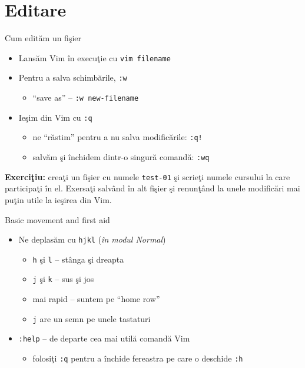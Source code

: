 \documentclass{beamer}
\begin{document}
\section{Editare}
\frame{\tableofcontents[currentsection]}

\begin{frame}{Cum edităm un fişier}
\begin{itemize}
  \item<1-> Lansăm Vim în execuţie cu \texttt{vim filename}
  \item<2-> Pentru a salva schimbările, \texttt{:w}
    \begin{itemize}
    \item<3-> ``save as'' -- \texttt{:w new-filename}
    \end{itemize}
  \item<4-> Ieşim din Vim cu \texttt{:q}
    \begin{itemize}
    \item<5-> ne ``răstim'' pentru a nu salva modificările: \texttt{:q!}
    \item<6-> salvăm şi închidem dintr-o singură comandă: \texttt{:wq}
    \end{itemize}
\end{itemize}

\textbf{Exerciţiu:} creaţi un fişier cu numele \texttt{test-01} şi
scrieţi numele cursului la care participaţi în el. Exersaţi salvând în alt
fişier şi renunţând la unele modificări mai puţin utile la ieşirea din Vim.
\end{frame}

\begin{frame}{Basic movement and first aid}
\begin{itemize}
  \item<1-> Ne deplasăm cu \texttt{hjkl} (\textit{în modul Normal})
    \begin{itemize}
    \item<2-> \texttt{h} şi \texttt{l} -- stânga şi dreapta
    \item<3-> \texttt{j} şi \texttt{k} -- sus şi jos
    \item<4-> mai rapid -- suntem pe ``home row''
    \item<5-> \texttt{j} are un semn pe unele tastaturi
    \end{itemize}
  \item<6-> \texttt{:help} -- de departe cea mai utilă comandă Vim
    \begin{itemize}
    \item<7-> folosiţi \texttt{:q} pentru a închide fereastra pe care o
    deschide \texttt{:h}
    \end{itemize}
\end{itemize}
\end{frame}
\end{document}
